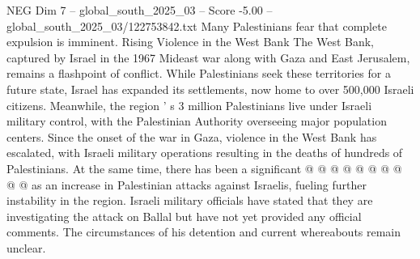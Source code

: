 \begin{textsample}{NEG Dim 7 – global\_south\_2025\_03 – Score -5.00 – global\_south\_2025\_03/122753842.txt}
Many Palestinians fear that complete expulsion is imminent.
Rising Violence in the West Bank The West Bank, captured by Israel in the 1967 Mideast war along with Gaza and East Jerusalem, remains a flashpoint of conflict.
While Palestinians seek these territories for a future state, Israel has expanded its settlements, now home to over 500,000 Israeli citizens.
Meanwhile, the region ' s 3 million Palestinians live under Israeli military control, with the Palestinian Authority overseeing major population centers.
Since the onset of the war in Gaza, violence in the West Bank has escalated, with Israeli military operations resulting in the deaths of hundreds of Palestinians.
At the same time, there has been a significant @ @ @ @ @ @ @ @ @ @ as an increase in Palestinian attacks against Israelis, fueling further instability in the region.
Israeli military officials have stated that they are investigating the attack on Ballal but have not yet provided any official comments.
The circumstances of his detention and current whereabouts remain unclear.

\end{textsample}
